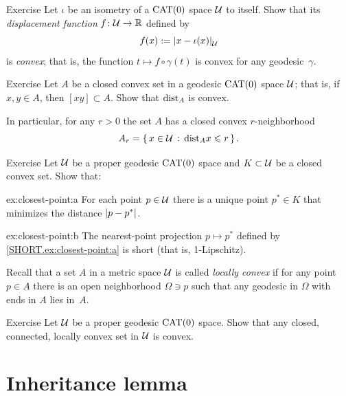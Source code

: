 \begin{thm}{Exercise}\label{ex:displacement}
Let $\iota$ be an isometry of a $\mathrm{CAT}(0)$ space $\mathcal{U}$ to itself.
Show that its \emph{displacement function} $f\colon\mathcal{U}\to\mathbb{R}$ defined by
\[f(x)\df\dist{x}{\iota(x)}{\spc{U}}\]
is \emph{convex};
that is, the function $t\mapsto f\circ \gamma(t)$ is convex for any geodesic~$\gamma$.
\end{thm}


\begin{thm}{Exercise}\label{ex:convex-nbhd}
Let $A$ be a closed convex set in a geodesic $\mathrm{CAT}(0)$ space $\mathcal{U}$;
that is, if $x,y\in A$, then $[xy]\subset A$.
Show that $\mathrm{dist}_A$ is convex.

In particular, for any $r>0$ the set $A$ has a closed convex $r$-neighborhood
\[A_r=\left\{\,{x\in \mathcal{U}}\,:\,{\mathrm{dist}_Ax\leqslant r}\,\right\}.\]

\end{thm}

\begin{thm}[!]{Exercise}\label{ex:closest-point}
Let  $\mathcal{U}$ be a proper geodesic $\mathrm{CAT}(0)$ space 
and $K\subset \mathcal{U}$ be a closed convex set.
Show that: 

\begin{subthm}{ex:closest-point:a}
For each point $p\in \mathcal{U}$ there is a unique point $p^*\in K$ that minimizes the distance $\dist{p}{p^*}{}$.
\end{subthm}

\begin{subthm}{ex:closest-point:b}
The nearest-point projection $p\mapsto p^*$ defined by \ref{SHORT.ex:closest-point:a} is short (that is, 1-Lipschitz). 
\end{subthm}

\end{thm}

Recall that a set $A$ in a metric space $\mathcal{U}$ is called \emph{locally convex} if for any point $p\in A$ there is an open neighborhood $\Omega\ni p$ such that any geodesic in $\Omega$ with  ends in $A$ lies in~$A$.

\begin{thm}[!]{Exercise}\label{ex:locally-convex}
Let $\mathcal{U}$ be a proper geodesic $\mathrm{CAT}(0)$ space.
Show that any closed, connected, locally convex set in $\mathcal{U}$ is convex.
\end{thm}


\section{Inheritance lemma} \label{sec:thin-triangle}

